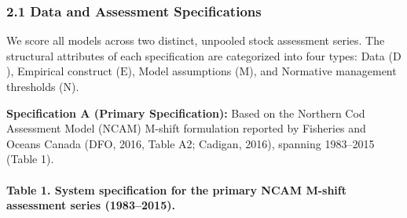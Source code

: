 \documentclass[11pt]{article}
\begin{document}
\subsubsection{2.1 Data and Assessment
Specifications}\label{data-and-assessment-specifications}

We score all models across two distinct, unpooled stock assessment
series. The structural attributes of each specification are categorized
into four types: Data (\(\mathrm{D}\)), Empirical construct
(\(\mathrm{E}\)), Model assumptions (\(\mathrm{M}\)), and Normative
management thresholds (\(\mathrm{N}\)).

\textbf{Specification A (Primary Specification):} Based on the Northern
Cod Assessment Model (NCAM) M-shift formulation reported by Fisheries
and Oceans Canada (DFO, 2016, Table A2; Cadigan, 2016), spanning
1983--2015 (Table 1).

\paragraph{Table 1. System specification for the primary NCAM M-shift
assessment series
(1983--2015).}\label{table-1.-system-specification-for-the-primary-ncam-m-shift-assessment-series-19832015.}
\end{document}
